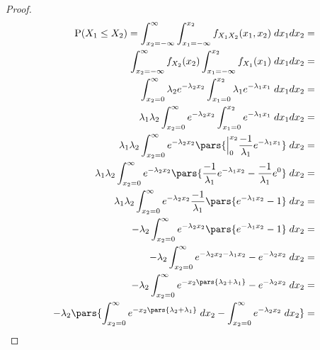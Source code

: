 \begin{proof}
	\begin{align*}
		\mathrm{P}(X_1 \leq X_2) = \int_{x_2 = -\infty}^{\infty} \int_{x_1 = -\infty}^{x_2} f_{X_{1}X_{2}}(x_1, x_2) \; dx_{1}dx_{2}                                                                       & = \\
		\int_{x_2 = -\infty}^{\infty} f_{X_{2}}(x_2) \int_{x_1 = -\infty}^{x_2} f_{X_1}(x_1) \; dx_{1}dx_{2}                                                                                               & = \\
		\int_{x_2 = 0}^{\infty} \lambda_2 e^{-\lambda_{2}x_2} \int_{x_1 = 0}^{x_2} \lambda_1 e^{-\lambda_1 x_1} \; dx_{1}dx_{2}                                                                            & = \\
		\lambda_1 \lambda_2 \int_{x_2 = 0}^{\infty} e^{-\lambda_{2}x_2} \int_{x_1 = 0}^{x_2} e^{-\lambda_1 x_1} \; dx_{1}dx_{2}                                                                            & = \\
		\lambda_1 \lambda_2 \int_{x_2 = 0}^{\infty} e^{-\lambda_{2}x_2} \pars{\Big\rvert_{0}^{x_2} \frac{-1}{\lambda_1} e^{-\lambda_1 x_1} } \;  dx_{2}                                                    & = \\
		\lambda_1 \lambda_2 \int_{x_2 = 0}^{\infty} e^{-\lambda_{2}x_2} \pars{\frac{-1}{\lambda_1} e^{-\lambda_1 x_2} - \frac{-1}{\lambda_1} e^0} \; dx_2                                                  & = \\
		\lambda_1 \lambda_2 \int_{x_2 = 0}^{\infty} e^{-\lambda_2 x_2} \frac{-1}{\lambda_1} \pars{e^{-\lambda_1 x_2} - 1} \; dx_2                                                                          & = \\
		-\lambda_2 \int_{x_2=0}^{\infty} e^{-\lambda_2 x_2} \pars{e^{-\lambda_1 x_2} - 1} \; dx_2                                                                                                          & = \\
		-\lambda_2 \int_{x_2=0}^{\infty} e^{-\lambda_2x_2 - \lambda_1 x_2} - e^{-\lambda_2 x_2} \; dx_2                                                                                                    & = \\
		-\lambda_2 \int_{x_2=0}^{\infty} e^{-x_2\pars{\lambda_2 + \lambda_1}} - e^{-\lambda_2 x_2} \; dx_2                                                                                                 & = \\
		-\lambda_2 \pars{\int_{x_2=0}^{\infty} e^{-x_2\pars{\lambda_2 + \lambda_1}} \; dx_2 - \int_{x_2=0}^{\infty} e^{-\lambda_2 x_2} \; dx_2}                                                            & = \\

\end{align*}
\end{proof}
